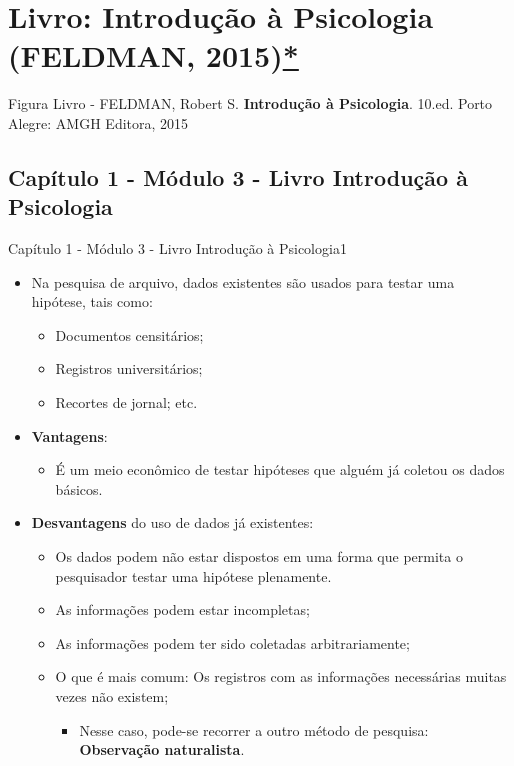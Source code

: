 \documentclass[
]{book}
\providecommand{\tightlist}{%
  \setlength{\itemsep}{0pt}\setlength{\parskip}{0pt}}
\begin{document}
\hypertarget{livro-introduuxe7uxe3o-uxe0-psicologia-feldman-2015}{%
\section{\texorpdfstring{Livro: \textbf{Introdução à Psicologia}
(FELDMAN,
2015)\protect\hyperlink{feldman}{*}}{Livro: Introdução à Psicologia (FELDMAN, 2015)*}}\label{livro-introduuxe7uxe3o-uxe0-psicologia-feldman-2015}}

Figura Livro - FELDMAN, Robert S. \textbf{Introdução à Psicologia}.
10.ed. Porto Alegre: AMGH Editora, 2015

\hypertarget{capuxedtulo-1---muxf3dulo-3---livro-introduuxe7uxe3o-uxe0-psicologia}{%
\subsection{Capítulo 1 - Módulo 3 - Livro Introdução à
Psicologia}\label{capuxedtulo-1---muxf3dulo-3---livro-introduuxe7uxe3o-uxe0-psicologia}}

Capítulo 1 - Módulo 3 - Livro Introdução à Psicologia1

\begin{itemize}
\tightlist
\item
  Na pesquisa de arquivo, dados existentes são usados para testar uma
  hipótese, tais como:

  \begin{itemize}
  \tightlist
  \item
    Documentos censitários;
  \item
    Registros universitários;
  \item
    Recortes de jornal; etc.
  \end{itemize}
\item
  \textbf{Vantagens}:

  \begin{itemize}
  \tightlist
  \item
    É um meio econômico de testar hipóteses que alguém já coletou os
    dados básicos.
  \end{itemize}
\item
  \textbf{Desvantagens} do uso de dados já existentes:

  \begin{itemize}
  \tightlist
  \item
    Os dados podem não estar dispostos em uma forma que permita o
    pesquisador testar uma hipótese plenamente.
  \item
    As informações podem estar incompletas;
  \item
    As informações podem ter sido coletadas arbitrariamente;
  \item
    O que é mais comum: Os registros com as informações necessárias
    muitas vezes não existem;

    \begin{itemize}
    \tightlist
    \item
      Nesse caso, pode-se recorrer a outro método de pesquisa:
      \textbf{Observação naturalista}.
    \end{itemize}
  \end{itemize}
\end{itemize}
\end{document}
